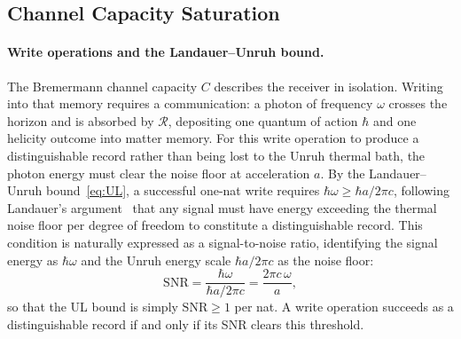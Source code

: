 \documentclass[12pt,a4paper]{article}
\begin{document}
\subsection{Channel Capacity Saturation}
\label{sec:sat}

\paragraph{Write operations and the Landauer--Unruh bound.}
The Bremermann channel capacity $C$ describes the 
receiver in isolation. Writing into that memory 
requires a communication: a photon of frequency 
$\omega$ crosses the horizon and is absorbed by 
$\mathcal{R}$, depositing one quantum of action 
$\hbar$ and one helicity outcome into matter memory. 
For this write operation to produce a distinguishable 
record rather than being lost to the Unruh thermal 
bath, the photon energy must clear the noise floor 
at acceleration $a$. By the Landauer--Unruh 
bound~\eqref{eq:UL}, a successful one-nat write 
requires $\hbar\omega \geq \hbar a/2\pi c$, following 
Landauer's argument~\cite{landauer1961irreversibility} 
that any signal must have energy exceeding the thermal 
noise floor per degree of freedom to constitute a 
distinguishable record. This condition is naturally 
expressed as a signal-to-noise ratio, identifying 
the signal energy as $\hbar\omega$ and the Unruh 
energy scale $\hbar a/2\pi c$ as the noise floor:
\begin{equation}
    \mathrm{SNR} = \frac{\hbar\omega}{\hbar a/2\pi c} 
    = \frac{2\pi c\,\omega}{a},
\end{equation}
so that the UL bound is simply $\mathrm{SNR} \geq 1$ 
per nat. A write operation succeeds as a 
distinguishable record if and only if its SNR clears 
this threshold.
\end{document}
